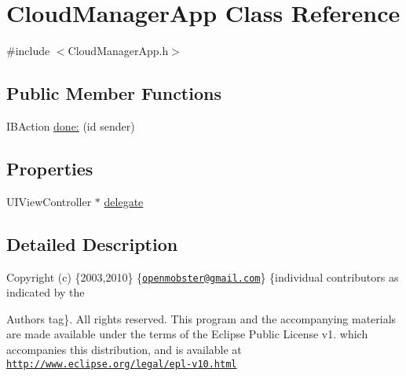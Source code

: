 \hypertarget{interface_cloud_manager_app}{
\section{\-Cloud\-Manager\-App \-Class \-Reference}
\label{interface_cloud_manager_app}
}


{\ttfamily \#include $<$\-Cloud\-Manager\-App.\-h$>$}

\subsection*{\-Public \-Member \-Functions}
\begin{DoxyCompactItemize}
\item 
\-I\-B\-Action \hyperlink{interface_cloud_manager_app_a19091dc32e0e237f95f886aa3a2a14a8}{done\-:} (id sender)
\end{DoxyCompactItemize}
\subsection*{\-Properties}
\begin{DoxyCompactItemize}
\item 
\-U\-I\-View\-Controller $\ast$ \hyperlink{interface_cloud_manager_app_aece0ab678730dbb0330a4db54b9b0a02}{delegate}
\end{DoxyCompactItemize}


\subsection{\-Detailed \-Description}
\-Copyright (c) \{2003,2010\} \{\href{mailto:openmobster@gmail.com}{\tt openmobster@gmail.\-com}\} \{individual contributors as indicated by the \begin{DoxyAuthor}{\-Authors}
tag\}. \-All rights reserved. \-This program and the accompanying materials are made available under the terms of the \-Eclipse \-Public \-License v1. which accompanies this distribution, and is available at \href{http://www.eclipse.org/legal/epl-v10.html}{\tt http\-://www.\-eclipse.\-org/legal/epl-\/v10.\-html} 
\end{DoxyAuthor}



